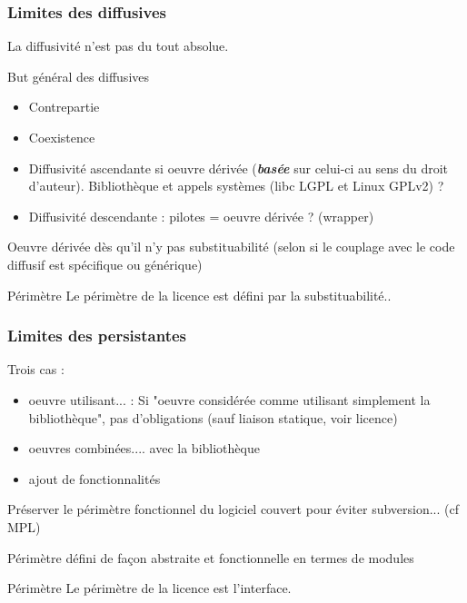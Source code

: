 \documentclass{beamer}
\begin{document}
\begin{frame}\frametitle{Limites des diffusives}
  La diffusivité n'est pas du tout absolue.

  \begin{block}{But général des diffusives}
    \begin{itemize}
    \item Contrepartie
    \item Coexistence
    \end{itemize}
  \end{block}

  \begin{itemize}
  \item Diffusivité ascendante si oeuvre dérivée
    (\textbf{\textit{basée}} sur celui-ci au sens du droit
    d'auteur). Bibliothèque et appels systèmes (libc LGPL et Linux
    GPLv2) ?
  \item Diffusivité descendante : pilotes = oeuvre dérivée ? (wrapper)
  \end{itemize}

  Oeuvre dérivée dès qu'il n'y pas substituabilité (selon si le
  couplage avec le code diffusif est spécifique ou générique)

  \begin{alertblock}{Périmètre}
    Le périmètre de la licence est défini par la substituabilité..
  \end{alertblock}
\end{frame}


\begin{frame}\frametitle{Limites des persistantes}
  Trois cas :
  \begin{itemize}
  \item oeuvre utilisant... : Si "oeuvre considérée comme utilisant
    simplement la bibliothèque", pas d'obligations (sauf liaison
    statique, voir licence)
  \item oeuvres combinées.... avec la bibliothèque
  \item ajout de fonctionnalités
  \end{itemize}

  Préserver le périmètre fonctionnel du logiciel couvert pour éviter
  subversion... (cf MPL)

  Périmètre défini de façon abstraite et fonctionnelle en termes de
  modules
  \begin{alertblock}{Périmètre}
    Le périmètre de la licence est l'interface.
  \end{alertblock}
  
\end{frame}
\end{document}
